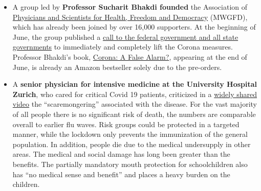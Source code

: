 \begin{itemize}
{  analysis paper} on corona crisis management, which was leaked to the
  press at the beginning of May and created
  \href{https://www.zeit.de/politik/deutschland/2020-05/corona-pandemie-bekaempfung-massnahmen-innenministerium-verschwoerungstheorien-regierungsrat/komplettansicht}{strong
  reactions}. In the paper, Covid-19 is described as a \textbf{``global
  false alarm''} because ``there was probably at no time a risk beyond
  the normal level'' for the general population. The collateral damage
  caused by the lockdown is now significantly higher than the
  recognizable benefit and far exceeds the risk potential of the corona
  virus. In March and April alone, over a million operations were not
  carried out in Germany. Crisis management and threat analysis mostly
  failed and data supplied by health authorities were ``inadequate'' as
  the basis for decision-making. The official was subsequently fired
  because he had created the paper ``without authorization''.
\item
  A group led by \textbf{Professor Sucharit Bhakdi founded} the
  Association of \href{https://www.mwgfd.de/}{Physicians and Scientists
  for Health, Freedom and Democracy} (MWGFD), which has already been
  joined by over 16,000 supporters. At the beginning of June, the group
  published a \href{https://www.mwgfd.de/category/topaktuell/}{call to
  the federal government and all state governments} to immediately and
  completely lift the Corona measures. Professor Bhakdi's book,
  \href{https://www.amazon.de/Corona-Fehlalarm-Daten-Fakten-Hintergr\%25C3\%25BCnde/dp/3990601911}{Corona:
  A False Alarm?}, appearing at the end of June, is already an Amazon
  bestseller solely due to the pre-orders.
\item
  A \textbf{senior physician for intensive medicine at the University
  Hospital Zurich}, who cared for critical Covid 19 patients, criticized
  in a
  \href{https://www.medinside.ch/de/post/corona-intensivmediziner-spricht-klartext}{widely
  shared video} the ``scaremongering'' associated with the disease. For
  the vast majority of all people there is no significant risk of death,
  the numbers are comparable overall to earlier flu waves. Risk groups
  could be protected in a targeted manner, while the lockdown only
  prevents the immunization of the general population. In addition,
  people die due to the medical undersupply in other areas. The medical
  and social damage has long been greater than the benefits. The
  partially mandatory mouth protection for schoolchildren also has ``no
  medical sense and benefit'' and places a heavy burden on the children.

\end{itemize}
